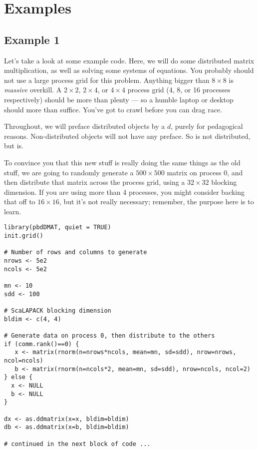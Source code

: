 \section{Examples}\label{sec:eg1}






\subsection{Example 1}

Let's take a look at some example code.  Here, we will do some distributed matrix multiplication, as well as solving some systems of equations.  You probably should not use a large process grid for this problem.  Anything bigger than $8\times 8$ is \emph{massive} overkill.  A $2\times 2$, $2\times 4$, or $4\times 4$ process grid (4, 8, or 16 processes respectively) should be more than plenty --- so a humble laptop or desktop should more than suffice.  You've got to crawl before you can drag race.

Throughout, we will preface distributed objects by a $d$, purely for pedagogical reasons.  Non-distributed objects will not have any preface.  So  is not distributed, but  is.

To convince you that this new stuff is really doing the same things as the old stuff, we are going to randomly generate a $500\times 500$ matrix on process 0, and then distribute that matrix across the process grid, using a $32\times 32$ blocking dimension.  If you are using more than 4 processes, you might consider backing that off to $16\times 16$, but it's not really necessary; remember, the purpose here is to learn.

\begin{lstlisting}[language=rr,title=Generating Test Data]
library(pbdDMAT, quiet = TRUE)
init.grid() 

# Number of rows and columns to generate
nrows <- 5e2
ncols <- 5e2

mn <- 10
sdd <- 100

# ScaLAPACK blocking dimension
bldim <- c(4, 4)

# Generate data on process 0, then distribute to the others
if (comm.rank()==0) {
   x <- matrix(rnorm(n=nrows*ncols, mean=mn, sd=sdd), nrow=nrows, ncol=ncols)
   b <- matrix(rnorm(n=ncols*2, mean=mn, sd=sdd), nrow=ncols, ncol=2)
} else {
  x <- NULL  
  b <- NULL
}

dx <- as.ddmatrix(x=x, bldim=bldim)
db <- as.ddmatrix(x=b, bldim=bldim)

# continued in the next block of code ...
\end{lstlisting}


